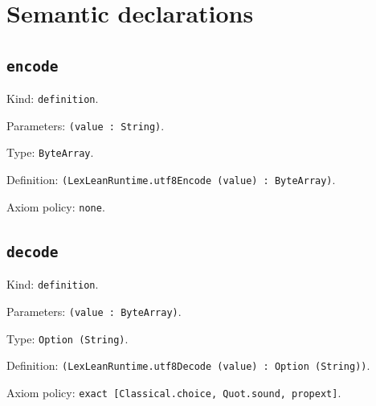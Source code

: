 \documentclass[11pt]{article}
\begin{document}
\section*{Semantic declarations}
\subsection*{\texttt{encode}}
\noindent Kind: \texttt{definition}.\par
\noindent Parameters: \texttt{(value : String)}.\par
\noindent Type: \texttt{ByteArray}.\par
\noindent Definition: \texttt{(LexLeanRuntime.utf8Encode (value) : ByteArray)}.\par
\noindent Axiom policy: \texttt{none}.\par
\subsection*{\texttt{decode}}
\noindent Kind: \texttt{definition}.\par
\noindent Parameters: \texttt{(value : ByteArray)}.\par
\noindent Type: \texttt{Option (String)}.\par
\noindent Definition: \texttt{(LexLeanRuntime.utf8Decode (value) : Option (String))}.\par
\noindent Axiom policy: \texttt{exact [Classical.choice, Quot.sound, propext]}.\par
\end{document}
